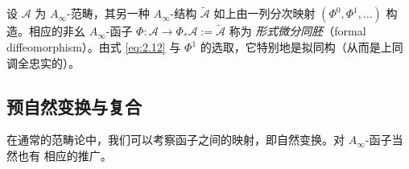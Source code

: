 \begin{Def}\label{def:2.9}
设 $\mathcal A$ 为 $A_\infty$-范畴，其另一种 $A_\infty$-结构
$\tilde{\mathcal A}$ 如上由一列分次映射 $(\Phi^0,\Phi^1,\dots)$ 构造。相应的非幺
$A_\infty$-函子 $\Phi:\mathcal A\to\Phi_*\mathcal A:=\tilde{\mathcal A}$ 称为
\emph{形式微分同胚}（formal diffeomorphism）。由式 \eqref{eq:2.12} 与 $\Phi^1$
的选取，它特别地是拟同构（从而是上同调全忠实的）。
\end{Def}

\subsection{预自然变换与复合}\label{sec:2.3}

在通常的范畴论中，我们可以考察函子之间的映射，即自然变换。对 $A_\infty$-函子当然也有
相应的推广。

